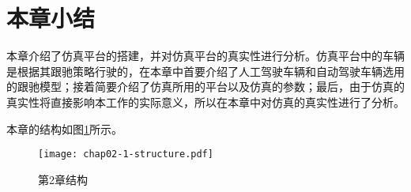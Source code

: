 \section{本章小结}

本章介绍了仿真平台的搭建，并对仿真平台的真实性进行分析。仿真平台中的车辆是根据其跟驰策略行驶的，在本章中首要介绍了人工驾驶车辆和自动驾驶车辆选用
的跟驰模型；接着简要介绍了仿真所用的平台以及仿真的参数；最后，由于仿真的真实性将直接影响本工作的实际意义，所以在本章中对仿真的真实性进行了分析。

本章的结构如图\ref{fig:chap02-1-logic}所示。

\begin{figure}
  \centering
  \texttt{[image: chap02-1-structure.pdf]}
  \caption{第2章结构}
  \label{fig:chap02-1-logic}
\end{figure}